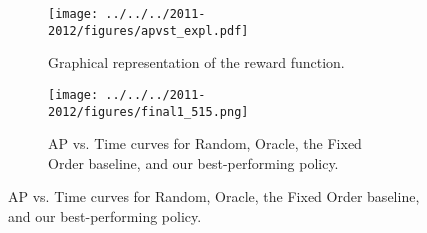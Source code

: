 \begin{figure}[h!]
\centering
\begin{subfigure}[b]{.48\linewidth}
\texttt{[image: ../../../2011-2012/figures/apvst\_expl.pdf]}
\caption{
    Graphical representation of the reward function.
}\label{fig:det_rewards}
\end{subfigure}
%
\begin{subfigure}[b]{.48\linewidth}
\texttt{[image: ../../../2011-2012/figures/final1\_515.png]}
\caption{
    AP vs. Time curves for Random, Oracle, the Fixed Order baseline, and our best-performing policy.
}\label{fig:det_results1}
\end{subfigure}
\end{figure}
